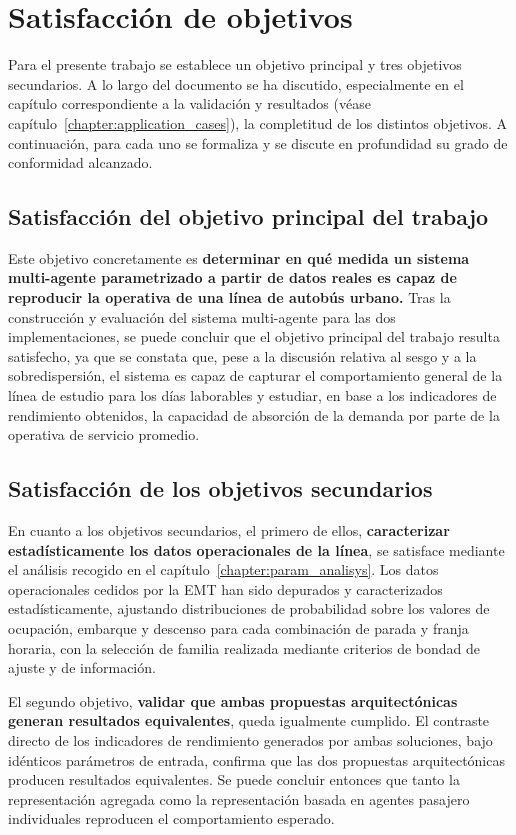 \section{Satisfacción de objetivos}
Para el presente trabajo se establece un objetivo principal y tres objetivos secundarios. A lo largo del documento se ha discutido,
especialmente en el capítulo correspondiente a la validación y resultados (véase capítulo~\ref{chapter:application_cases}), la completitud
de los distintos objetivos. A continuación, para cada uno se formaliza y se discute en profundidad su grado de conformidad alcanzado.

\subsection{Satisfacción del objetivo principal del trabajo}
Este objetivo concretamente es \textbf{determinar en qué medida un sistema multi-agente parametrizado a partir de datos reales
es capaz de reproducir la operativa de una línea de autobús urbano.} Tras la construcción
y evaluación del sistema multi-agente para las dos implementaciones, se puede concluir que el objetivo principal del trabajo
resulta satisfecho, ya que se constata que, pese a la discusión relativa al sesgo y a la sobredispersión, el sistema es capaz
de capturar el comportamiento general de la línea de estudio para los días laborables y estudiar, en base a los indicadores
de rendimiento obtenidos, la capacidad de absorción de la demanda por parte de la operativa de servicio promedio.

\subsection{Satisfacción de los objetivos secundarios}

En cuanto a los objetivos secundarios, el primero de ellos, \textbf{caracterizar estadísticamente los datos operacionales de la línea},
se satisface mediante el análisis
recogido en el capítulo~\ref{chapter:param_analisys}. Los datos operacionales cedidos por la
EMT han sido depurados y caracterizados estadísticamente, ajustando distribuciones de
probabilidad sobre los valores de ocupación, embarque y descenso para cada combinación de
parada y franja horaria, con la selección de familia realizada mediante criterios de bondad
de ajuste y de información.

El segundo objetivo, \textbf{validar que ambas propuestas arquitectónicas generan resultados equivalentes},
queda igualmente cumplido. El contraste directo de los indicadores de
rendimiento generados por ambas soluciones, bajo idénticos parámetros de entrada, confirma que las dos propuestas arquitectónicas
producen resultados equivalentes. Se puede concluir entonces que tanto la representación agregada como la
representación basada en agentes pasajero individuales reproducen el comportamiento esperado.

